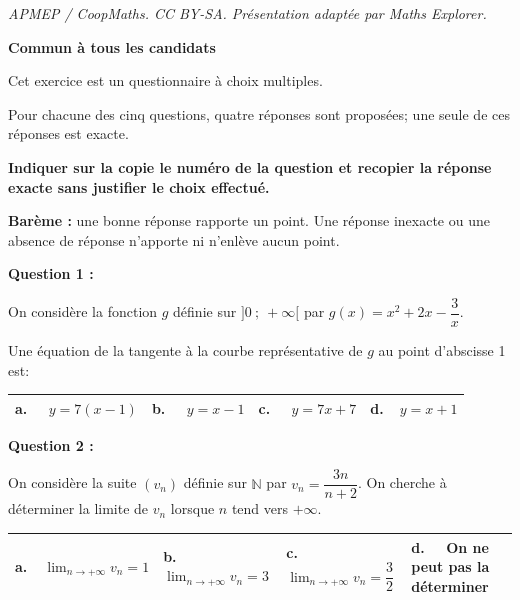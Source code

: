 \documentclass[10pt]{article}
\providecommand{\N}{\mathbb{N}}
\begin{document}
\noindent\textit{APMEP / CoopMaths. CC BY-SA. Présentation adaptée par Maths Explorer.}\par\medskip
\textbf{Commun à tous les candidats}

\medskip

Cet exercice est un questionnaire à choix multiples. 

Pour chacune des cinq questions, quatre
réponses sont proposées; une seule de ces réponses est exacte.

\smallskip

\textbf{Indiquer sur la copie le numéro de la question et recopier la réponse exacte sans justifier le choix effectué.}

\textbf{Barème :} une bonne réponse rapporte un point. Une réponse inexacte ou une absence de réponse n'apporte ni n'enlève aucun point.

\bigskip

\textbf{Question 1 :}

On considère la fonction $g$ définie sur $]0~;~+\infty[$  par $g(x)= x^2+ 2x - \dfrac{3}{x}$.

Une équation de la tangente à la courbe représentative de $g$ au point d'abscisse 1 est: 
\begin{center}
\begin{tabularx}{\linewidth}{|*{4}{X|}}\hline
\textbf{a.~~} $y=7(x - 1)$&\textbf{b.~~} $y = x - 1$&\textbf{c.~~} $y = 7x + 7$&\textbf{d.~~}$ y = x +1$\\ \hline
\end{tabularx}
\end{center}

\medskip

\textbf{Question 2 :}

On considère la suite $\left(v_n\right)$ définie sur $\N$ par $v_n = \dfrac{3n}{n + 2}$. On cherche à déterminer la limite de $v_n$ lorsque $n$ tend vers $+\infty$.

\begin{center}
\begin{tabularx}{\linewidth}{|*{4}{X|}}\hline
\textbf{a.~~}$\displaystyle\lim_{n \to + \infty}v_n = 1$&
\textbf{b.~~} $\displaystyle\lim_{n \to + \infty}v_n = 3$ &  \textbf{c.~~} $\displaystyle\lim_{n \to + \infty}v_n = \dfrac{3}{2}$ &\textbf{d.~~} On ne peut pas la déterminer\\ \hline
\end{tabularx}
\end{center}

\medskip
\end{document}
